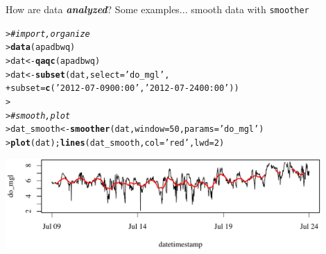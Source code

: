 \documentclass[serif]{beamer}\usepackage[]{graphicx}\usepackage[]{color}
\makeatletter
\newcommand{\hlnum}[1]{\textcolor[rgb]{0.686,0.059,0.569}{#1}}%
\newcommand{\hlstr}[1]{\textcolor[rgb]{0.192,0.494,0.8}{#1}}%
\newcommand{\hlcom}[1]{\textcolor[rgb]{0.678,0.584,0.686}{\textit{#1}}}%
\newcommand{\hlstd}[1]{\textcolor[rgb]{0.345,0.345,0.345}{#1}}%
\newcommand{\hlkwb}[1]{\textcolor[rgb]{0.69,0.353,0.396}{#1}}%
\newcommand{\hlkwc}[1]{\textcolor[rgb]{0.333,0.667,0.333}{#1}}%
\newcommand{\hlkwd}[1]{\textcolor[rgb]{0.737,0.353,0.396}{\textbf{#1}}}%
\newenvironment{kframe}{%
 \def\at@end@of@kframe{}%
 \ifinner\ifhmode%
  \def\at@end@of@kframe{\end{minipage}}%
  \begin{minipage}{\columnwidth}%
 \fi\fi%
 \def\FrameCommand##1{\hskip\@totalleftmargin \hskip-\fboxsep
 \colorbox{shadecolor}{##1}\hskip-\fboxsep
     \hskip-\linewidth \hskip-\@totalleftmargin \hskip\columnwidth}%
 \MakeFramed {\advance\hsize-\width
   \@totalleftmargin\z@ \linewidth\hsize
   \@setminipage}}%
 {\par\unskip\endMakeFramed%
 \at@end@of@kframe}
\newenvironment{knitrout}{}{} %
\newcommand{\Bigtxt}[1]{\textbf{\textit{#1}}}
\makeatother
\begin{document}
\begin{frame}[fragile,t]{How are data \Bigtxt{analyzed}?}
Some examples... smooth data with \texttt{smoother}
\begin{knitrout}\scriptsize
{}\color{fgcolor}\begin{kframe}
\begin{alltt}
\hlstd{> }\hlcom{# import, organize}
\hlstd{> }\hlkwd{data}\hlstd{(apadbwq)}
\hlstd{> }\hlstd{dat} \hlkwb{<-} \hlkwd{qaqc}\hlstd{(apadbwq)}
\hlstd{> }\hlstd{dat} \hlkwb{<-} \hlkwd{subset}\hlstd{(dat,} \hlkwc{select} \hlstd{=} \hlstr{'do_mgl'}\hlstd{,}
\hlstd{+ }  \hlkwc{subset} \hlstd{=} \hlkwd{c}\hlstd{(}\hlstr{'2012-07-09 00:00'}\hlstd{,} \hlstr{'2012-07-24 00:00'}\hlstd{))}
\hlstd{> }
\hlstd{> }\hlcom{# smooth, plot}
\hlstd{> }\hlstd{dat_smooth} \hlkwb{<-} \hlkwd{smoother}\hlstd{(dat,} \hlkwc{window} \hlstd{=} \hlnum{50}\hlstd{,} \hlkwc{params} \hlstd{=} \hlstr{'do_mgl'}\hlstd{)}
\hlstd{> }\hlkwd{plot}\hlstd{(dat);} \hlkwd{lines}\hlstd{(dat_smooth,} \hlkwc{col} \hlstd{=} \hlstr{'red'}\hlstd{,} \hlkwc{lwd} \hlstd{=} \hlnum{2}\hlstd{)}
\end{alltt}
\end{kframe}

{\centering \includegraphics[width=0.9\textwidth]{fig//smooth} 

}



\end{knitrout}
\end{frame}
\end{document}
